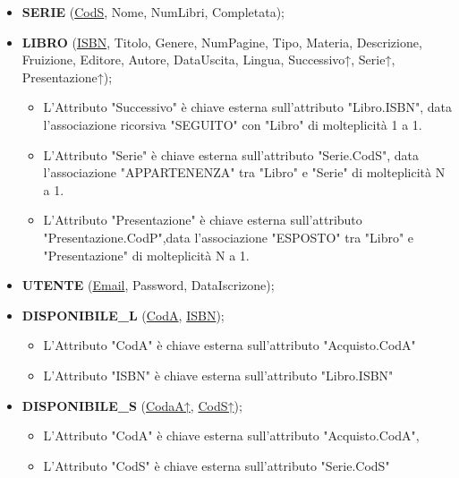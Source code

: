 \begin{itemize}
        \item {\bf SERIE} (\underline{CodS}, Nome, NumLibri, Completata); 
        
        \item {\bf LIBRO} (\underline{ISBN}, Titolo, Genere, NumPagine, Tipo, Materia, Descrizione, Fruizione, Editore, Autore, DataUscita,  Lingua, Successivo↑, Serie↑, Presentazione↑);
            \begin{itemize}
            \item L'Attributo "Successivo" è chiave esterna sull'attributo "Libro.ISBN", data l'associazione ricorsiva "SEGUITO" con "Libro" di molteplicità 1 a 1. 
            \item L'Attributo "Serie" è chiave esterna sull'attributo "Serie.CodS", data l'associazione "APPARTENENZA" tra "Libro" e "Serie" di molteplicità N a 1.
            \item L'Attributo "Presentazione" è chiave esterna sull'attributo "Presentazione.CodP",data l'associazione "ESPOSTO" tra "Libro" e "Presentazione" di molteplicità N a 1.
        \end{itemize}

        \item {\bf UTENTE} (\underline{Email}, Password, DataIscrizone);
        
        \item {\bf DISPONIBILE\_L} (\underline{CodA}, \underline{ISBN});
        \begin{itemize}
            \textit{Relazione derivata dalla associazione "DISPONIBILE\_L" di molteplicità N a N, tra "Libro" e "Acquisto".}
            \item L'Attributo "CodA" è chiave esterna sull'attributo "Acquisto.CodA"
            \item L'Attributo "ISBN" è chiave esterna sull'attributo "Libro.ISBN"
        \end{itemize}
        
        \item {\bf DISPONIBILE\_S} (\underline{CodaA↑}, \underline{CodS↑});
        \begin{itemize}
            \textit{Relazione derivata dalla associazione "DISPONIBILE\_S" di molteplicità N a N, tra "Serie" e "Acquisto".}
            \item L'Attributo "CodA" è chiave esterna sull'attributo "Acquisto.CodA",
            \item L'Attributo "CodS" è chiave esterna sull'attributo "Serie.CodS"
        \end{itemize}
        

\end{itemize}

